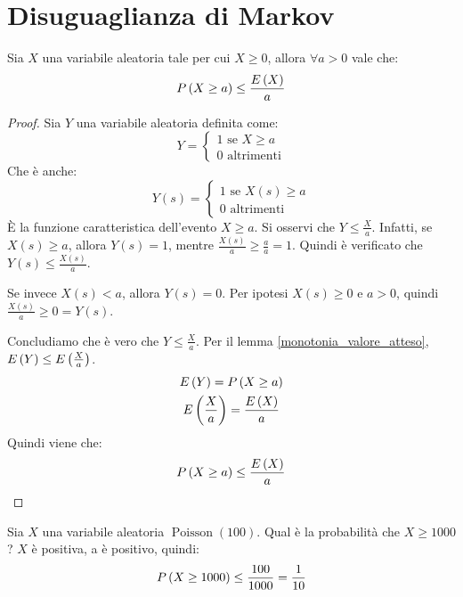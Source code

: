 



\section{Disuguaglianza di Markov}

\begin{prop}
Sia $X$ una variabile aleatoria tale per cui $X \ge 0$, allora $\forall a > 0$ vale che:
\[
P \left( {X \ge a} \right) \le \frac{E \left( X \right)}{a}
\]
\end{prop}
\begin{proof}
Sia $Y$ una variabile aleatoria definita come:
\[
Y = 
\begin{cases}
1 \text{ se } X \ge a \\
0 \text{ altrimenti}
\end{cases}
\]
Che \`e anche:
\[
Y(s) = 
\begin{cases}
1 \text{ se } X(s) \ge a \\
0 \text{ altrimenti}
\end{cases}
\]
\`E la funzione caratteristica dell'evento $X \ge a$. Si osservi che $Y \le \frac{X}{a}$. Infatti, se $X(s) \ge a$, allora $Y(s) = 1$, mentre $\frac{X(s)}{a} \ge \frac{a}{a} = 1$. Quindi \`e verificato che $Y(s) \le \frac{X(s)}{a}$.

Se invece $X(s) < a$, allora $Y(s) = 0$. Per ipotesi $X(s) \ge 0$ e $a > 0$, quindi $\frac{X(s)}{a} \ge 0 = Y(s)$.

Concludiamo che \`e vero che $Y \le \frac{X}{a}$. Per il lemma \ref{monotonia_valore_atteso}, $E \left( Y \right) \le E \left( \frac{X}{a} \right)$.
\begin{gather*}
E \left( Y \right) = P \left( {X \ge a} \right) \\
E \left( \frac{X}{a} \right) = \frac{E \left( X \right)}{a}
\end{gather*}
Quindi viene che:
\[
P \left( {X \ge a} \right) \le \frac{E \left( X \right)}{a}
\]
\end{proof}

\begin{exmp}
Sia $X$ una variabile aleatoria $\operatorname{Poisson} (100)$. Qual \`e la probabilit\`a che $X \ge 1000$? $X$ \`e positiva, a \`e positivo, quindi:
\[
P \left( {X \ge 1000} \right) \le \frac{100}{1000} = \frac{1}{10}
\]
\end{exmp}

